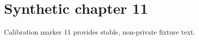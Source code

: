 \chapter{Synthetic chapter 11}\label{chap:11}
Calibration marker 11 provides stable, non-private fixture text.
